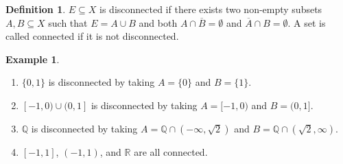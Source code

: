 \documentclass[10pt]{article}
\newcommand{\R}{\mathbb{R}}
\newcommand{\Q}{\mathbb{Q}}
\theoremstyle{definition}
\newtheorem{definition}[theorem]{Definition}
\newtheorem{example}[theorem]{Example}
\theoremstyle{remark}
\begin{document}
\begin{definition}
    $E \subseteq X$ is disconnected if there exists two non-empty subsets $A, B \subseteq X$ such that $E = A \cup B$ and both $A \cap \overline{B} = \emptyset$ and $\overline{A} \cap B = \emptyset$.
    A set is called connected if it is not disconnected.
\end{definition}

\begin{example}
    \hfill
    \begin{enumerate}
        \item $\{0, 1\}$ is disconnected by taking $A = \{0\}$ and $B = \{1\}$.
        \item $[-1, 0) \cup (0, 1]$ is disconnected by taking $A = [-1, 0)$ and $B = (0, 1]$.
        \item $\Q$ is disconnected by taking $A = \Q \cap (-\infty, \sqrt{2})$ and $B = \Q \cap (\sqrt{2}, \infty)$.
        \item $[-1, 1]$, $(-1, 1)$, and $\R$ are all connected.
    \end{enumerate}
\end{example}
\end{document}
